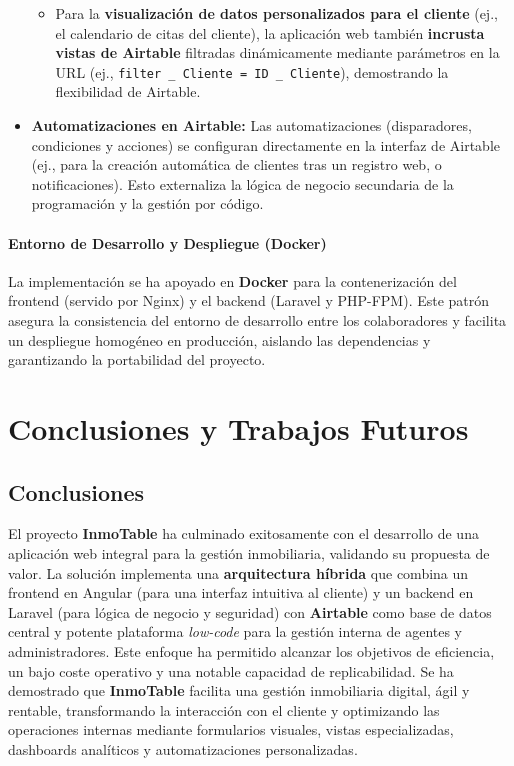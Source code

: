 \begin{itemize}
\begin{itemize}
        \item Para la \textbf{visualización de datos personalizados para el cliente} (ej., el calendario de citas del cliente), la aplicación web también \textbf{incrusta vistas de Airtable} filtradas dinámicamente mediante parámetros en la URL (ej., \texttt{filter \_ Cliente = ID \_ Cliente}), demostrando la flexibilidad de Airtable.
    \end{itemize}
    
    \item \textbf{Automatizaciones en Airtable:} Las automatizaciones (disparadores, condiciones y acciones) se configuran directamente en la interfaz de Airtable (ej., para la creación automática de clientes tras un registro web, o notificaciones). Esto externaliza la lógica de negocio secundaria de la programación y la gestión por código.
\end{itemize}


\subsubsection{Entorno de Desarrollo y Despliegue (Docker)}


La implementación se ha apoyado en \textbf{Docker} para la contenerización del frontend (servido por Nginx) y el backend (Laravel y PHP-FPM). Este patrón asegura la consistencia del entorno de desarrollo entre los colaboradores y facilita un despliegue homogéneo en producción, aislando las dependencias y garantizando la portabilidad del proyecto.


\chapter{Conclusiones y Trabajos Futuros} 
\label{sec:conclusionesytrabajosfuturos}


\section{Conclusiones} 


El proyecto \textbf{InmoTable} ha culminado exitosamente con el desarrollo de una aplicación web integral para la gestión inmobiliaria, validando su propuesta de valor. La solución implementa una \textbf{arquitectura híbrida} que combina un frontend en Angular (para una interfaz intuitiva al cliente) y un backend en Laravel (para lógica de negocio y seguridad) con \textbf{Airtable} como base de datos central y potente plataforma \textit{low-code} para la gestión interna de agentes y administradores. Este enfoque ha permitido alcanzar los objetivos de eficiencia, un bajo coste operativo y una notable capacidad de replicabilidad. Se ha demostrado que \textbf{InmoTable} facilita una gestión inmobiliaria digital, ágil y rentable, transformando la interacción con el cliente y optimizando las operaciones internas mediante formularios visuales, vistas especializadas, dashboards analíticos y automatizaciones personalizadas.


